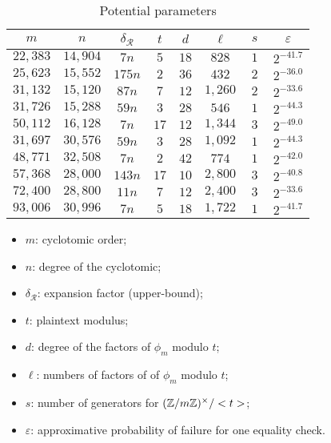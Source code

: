 \begin{table}
  \setlength{\tabcolsep}{1em}
  \centering
  \begin{tabular}{||ccc||ccccc||}
    \hline
    $~m~$ & $~n~$ & $~\delta_\mathcal{R}~$ & $~t~$ & $~d~$ & $~\ell~$ & $~s~$ & $~\varepsilon~$ \\
    \hline
    $22,383$ & $14,904$ & $7n$ & $5$  & $18$ & $828$  & $1$ &  $2^{-41.7}$ \\
    $25,623$ & $15,552$ & $175n$ & $2$ & $36$ & $432$ & $2$ & $2^{-36.0}$ \\
    $31,132$ & $15,120$ & $87n$ & $7$ & $12$ & $1,260$ & $2$ & $2^{-33.6}$ \\
    $31,726$ & $15,288$ & $59n$ & $3$ & $28$ & $546$ & $1$ & $2^{-44.3}$ \\
    $50,112$ & $16,128$ & $7n$ & $17$ & $12$ & $1,344$ & $3$ & $2^{-49.0}$ \\
    \hline
    $31,697$ & $30,576$ & $59n$ & $3$ & $28$ & $1,092$ & $1$ & $2^{-44.3}$ \\
    $48,771$ & $32,508$ & $7n$ & $2$ & $42$ & $774$ & $1$ & $2^{-42.0}$ \\
    $57,368$ & $28,000$ & $143n$ & $17$ & $10$ & $2,800$ & $3$ & $2^{-40.8}$ \\
    $72,400$ & $28,800$ & $11n$ & $7$ & $12$ & $2,400$ & $3$ & $2^{-33.6}$ \\
    $93,006$ & $30,996$ & $7n$ & $5$ & $18$ & $1,722$ & $1$ & $2^{-41.7}$ \\
    \hline
                                                   
  \end{tabular}
  \caption{Potential parameters}
  \label{tab:params}
\end{table}

\begin{itemize}
\item $m$: cyclotomic order;
\item $n$: degree of the cyclotomic;
\item $\delta_\mathcal{R}$: expansion factor (upper-bound);
\item $t$: plaintext modulus;
\item $d$: degree of the factors of $\phi_m$ modulo $t$;
\item $\ell$: numbers of factors of of $\phi_m$ modulo $t$;
\item $s$: number of generators for $(\mathbb{Z}/m\mathbb{Z})^\times/<t>$;
\item $\varepsilon$: approximative probability of failure for one equality check.
\end{itemize}


